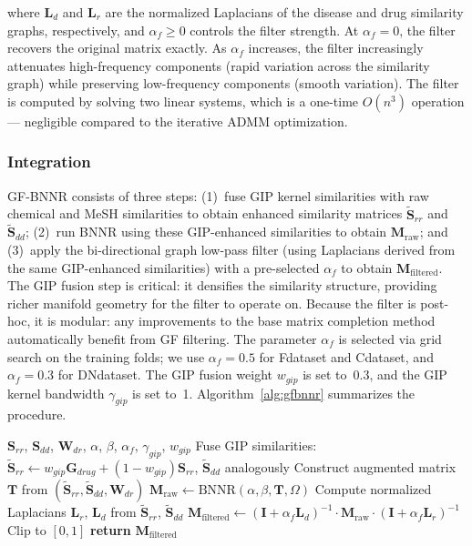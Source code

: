 \documentclass[unnumsec,webpdf,contemporary,large]{oup-authoring-template}
\begin{document}
where $\mathbf{L}_d$ and $\mathbf{L}_r$ are the normalized Laplacians of the disease and drug similarity graphs, respectively, and $\alpha_f \geq 0$ controls the filter strength. At $\alpha_f = 0$, the filter recovers the original matrix exactly. As $\alpha_f$ increases, the filter increasingly attenuates high-frequency components (rapid variation across the similarity graph) while preserving low-frequency components (smooth variation). The filter is computed by solving two linear systems, which is a one-time $O(n^3)$ operation --- negligible compared to the iterative ADMM optimization.

\subsubsection{Integration}
\label{sec:gfbnnr_integration}

GF-BNNR consists of three steps: (1)~fuse GIP kernel similarities with raw chemical and MeSH similarities to obtain enhanced similarity matrices $\tilde{\mathbf{S}}_{rr}$ and $\tilde{\mathbf{S}}_{dd}$; (2)~run BNNR using these GIP-enhanced similarities to obtain $\mathbf{M}_{\text{raw}}$; and (3)~apply the bi-directional graph low-pass filter (using Laplacians derived from the same GIP-enhanced similarities) with a pre-selected $\alpha_f$ to obtain $\mathbf{M}_{\text{filtered}}$. The GIP fusion step is critical: it densifies the similarity structure, providing richer manifold geometry for the filter to operate on. Because the filter is post-hoc, it is modular: any improvements to the base matrix completion method automatically benefit from GF filtering. The parameter $\alpha_f$ is selected via grid search on the training folds; we use $\alpha_f = 0.5$ for Fdataset and Cdataset, and $\alpha_f = 0.3$ for DNdataset. The GIP fusion weight $w_{gip}$ is set to~0.3, and the GIP kernel bandwidth $\gamma_{gip}$ is set to~1. Algorithm~\ref{alg:gfbnnr} summarizes the procedure.

\begin{algorithm}[t]
\caption{GF-BNNR}
\label{alg:gfbnnr}
\begin{algorithmic}[1]
\Require $\mathbf{S}_{rr}$, $\mathbf{S}_{dd}$, $\mathbf{W}_{dr}$, $\alpha$, $\beta$, $\alpha_f$, $\gamma_{gip}$, $w_{gip}$
\State Fuse GIP similarities: $\tilde{\mathbf{S}}_{rr} \leftarrow w_{gip}\mathbf{G}_{drug} + (1-w_{gip})\mathbf{S}_{rr}$, $\tilde{\mathbf{S}}_{dd}$ analogously
\State Construct augmented matrix $\mathbf{T}$ from $(\tilde{\mathbf{S}}_{rr}, \tilde{\mathbf{S}}_{dd}, \mathbf{W}_{dr})$
\State $\mathbf{M}_{\text{raw}} \leftarrow \text{BNNR}(\alpha, \beta, \mathbf{T}, \Omega)$
\State Compute normalized Laplacians $\mathbf{L}_r$, $\mathbf{L}_d$ from $\tilde{\mathbf{S}}_{rr}$, $\tilde{\mathbf{S}}_{dd}$
\State $\mathbf{M}_{\text{filtered}} \leftarrow (\mathbf{I} + \alpha_f \mathbf{L}_d)^{-1} \cdot \mathbf{M}_{\text{raw}} \cdot (\mathbf{I} + \alpha_f \mathbf{L}_r)^{-1}$
\State Clip to $[0, 1]$
\State \textbf{return} $\mathbf{M}_{\text{filtered}}$
\end{algorithmic}
\end{algorithm}
\end{document}
